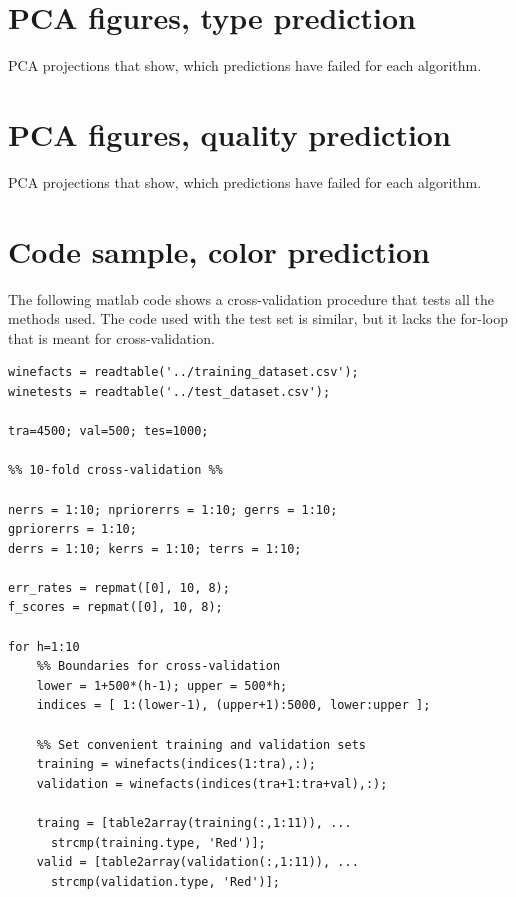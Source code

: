 \documentclass[twoside]{article}
\begin{document}
\begin{multicols}{2}

{}

\appendix

\section{PCA figures, type prediction}\label{appendix:colorpcakuvet}
PCA projections that show, which predictions have failed for each algorithm.

\section{PCA figures, quality prediction}\label{appendix:qualitypcakuvet}
PCA projections that show, which predictions have failed for each algorithm.


\section{Code sample, color prediction}\label{appendix:colorcode}

The following matlab code shows a cross-validation procedure
that tests all the methods used. The code used with the test
set is similar, but it lacks the for-loop that is meant for 
cross-validation.

{\footnotesize

\begin{verbatim}
winefacts = readtable('../training_dataset.csv');
winetests = readtable('../test_dataset.csv');

tra=4500; val=500; tes=1000;

%% 10-fold cross-validation %%

nerrs = 1:10; npriorerrs = 1:10; gerrs = 1:10; 
gpriorerrs = 1:10;
derrs = 1:10; kerrs = 1:10; terrs = 1:10;

err_rates = repmat([0], 10, 8); 
f_scores = repmat([0], 10, 8); 

for h=1:10
    %% Boundaries for cross-validation
    lower = 1+500*(h-1); upper = 500*h;
    indices = [ 1:(lower-1), (upper+1):5000, lower:upper ];

    %% Set convenient training and validation sets
    training = winefacts(indices(1:tra),:);
    validation = winefacts(indices(tra+1:tra+val),:);

    traing = [table2array(training(:,1:11)), ... 
      strcmp(training.type, 'Red')];
    valid = [table2array(validation(:,1:11)), ... 
      strcmp(validation.type, 'Red')];


\end{verbatim}}
\end{multicols}
\end{document}
